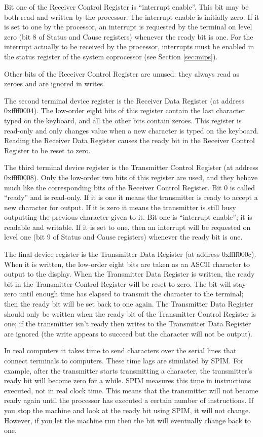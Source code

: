 \documentclass[11pt]{article}
\begin{document}
Bit one of the Receiver Control Register is ``interrupt enable''.
This bit may be both read and written by the processor.  The interrupt
enable is initially zero.  If it is set to one by the processor, an
interrupt is requested by the terminal on level zero (bit 8 of Status
and Cause registers) whenever the
ready bit is one.  For the interrupt actually to be received by the
processor, interrupts must be enabled in the status register of the
system coprocessor (see Section \ref{sec:mips}).

Other bits of the Receiver Control Register are unused: they always
read as zeroes and are ignored in writes.

The second terminal device register is the Receiver Data Register (at
address 0xf{f}f{f}0004).  The low-order eight bits of this register
contain the last character typed on the keyboard, and all the other
bits contain zeroes.  This register is read-only and only changes
value when a new character is typed on the keyboard.  Reading the
Receiver Data Register causes the ready bit in the Receiver Control
Register to be reset to zero.

The third terminal device register is the Transmitter Control Register
(at address 0xf{f}f{f}0008).  Only the low-order two bits of this register
are used, and they behave much like the corresponding bits of the
Receiver Control Register.  Bit 0 is called ``ready'' and is
read-only.  If it is one it means the transmitter is ready to accept a
new character for output.  If it is zero it means the transmitter is
still busy outputting the previous character given to it.  Bit one is
``interrupt enable''; it is readable and writable.  If it is set to
one, then an interrupt will be requested on level one (bit 9 of Status
and Cause registers) whenever the
ready bit is one.

The final device register is the Transmitter Data Register (at address
0xf{f}f{f}000c).  When it is written, the low-order eight bits are taken
as an ASCII character to output to the display.  When the Transmitter
Data Register is written, the ready bit in the Transmitter Control
Register will be reset to zero.  The bit will stay zero until enough
time has elapsed to transmit the character to the terminal; then the
ready bit will be set back to one again.  The Transmitter Data
Register should only be written when the ready bit of the Transmitter
Control Register is one; if the transmitter isn't ready then writes to
the Transmitter Data Register are ignored (the write appears to
succeed but the character will not be output).

In real computers it takes time to send characters over the serial
lines that connect terminals to computers.  These time lags are
simulated by SPIM.  For example, after the transmitter starts
transmitting a character, the transmitter's ready bit will become zero
for a while.  SPIM measures this time in instructions executed, not in
real clock time.  This means that the transmitter will not become
ready again until the processor has executed a certain number of
instructions.  If you stop the machine and look at the ready bit using
SPIM, it will not change.  However, if you let the machine run then
the bit will eventually change back to one.
\end{document}
